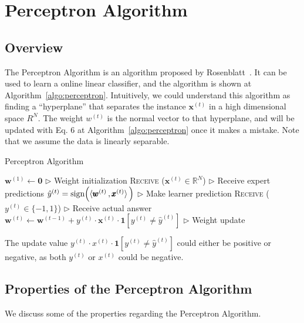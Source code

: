 \documentclass[11pt]{article}
\begin{document}
\section{Perceptron Algorithm}

\subsection{Overview}
\normalfont

The Perceptron Algorithm is an algorithm proposed by Rosenblatt~\cite{rosenblatt1958perceptron}. It can be used to learn a online linear classifier, and the algorithm is shown at Algorithm~\ref{algo:perceptron}. Intuitively, we could understand this algorithm as finding a ``hyperplane'' that separates the instance $\mathbf{x}^{(t)}$ in a high dimensional space $R^{N}$. The weight $w^{(t)}$ is the normal vector to that hyperplane, and will be updated with Eq. 6 at Algorithm~\ref{algo:perceptron} once it makes a mistake. Note that we assume the data is linearly separable. %

\begin{algorithm}[H]
\caption{Perceptron Algorithm}
\label{algo:perceptron}
\begin{algorithmic}[1]
\STATE $\pmb{w}^{(1)} \leftarrow \mathbf{0}$ \hfill $\triangleright$ Weight initialization
\STATE \textsc{Receive} ($\pmb{x}^{(t)}\in \mathbb{R}^N$) \hfill $\triangleright$ Receive expert predictions
\STATE $\hat{y}^{(t)} = \text{sign}\Big( \langle  \pmb{w}^{(t)}  \, , \pmb{x}^{(t)}  \rangle\, \Big)$ \hfill $\triangleright$ Make learner prediction
\STATE \textsc{Receive} ($y^{(t)}\in\{-1, 1\}$) \hfill $\triangleright$ Receive actual answer
\STATE $\pmb{w}^{(t)}\leftarrow \pmb{w}^{(t-1)} + y^{(t)} \cdot \pmb{x}^{(t)} \cdot \pmb{1}[y^{(t)}\neq \hat{y}^{(t)}] $ \hfill $\triangleright$ Weight update
\ENDFOR
\end{algorithmic}
\end{algorithm}

The update value $y^{(t)} \cdot x^{(t)} \cdot\textbf{1}[y^{(t)}\neq \hat{y}^{(t)}]$ could either be positive or negative, as both $y^{(t)}$ or $x^{(t)}$ could be negative.

\subsection{Properties of the Perceptron Algorithm}
We discuss some of the properties regarding the Perceptron Algorithm.
\end{document}
